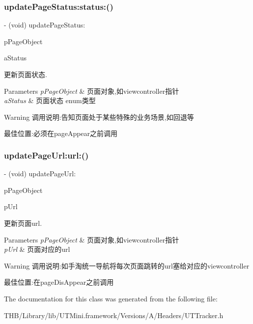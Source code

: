 \subsubsection{\texorpdfstring{update\+Page\+Status\+:status\+:()}{updatePageStatus:status:()}}
{\footnotesize\ttfamily -\/ (void) update\+Page\+Status\+: \begin{DoxyParamCaption}\item[{(id)}]{p\+Page\+Object }\item[{status:(U\+T\+Page\+Status)}]{a\+Status }\end{DoxyParamCaption}}



更新页面状态. 


\begin{DoxyParams}{Parameters}
{\em p\+Page\+Object} & 页面对象,如viewcontroller指针 \\
\hline
{\em a\+Status} & 页面状态 enum类型\\
\hline
\end{DoxyParams}
\begin{DoxyWarning}{Warning}
调用说明\+:告知页面处于某些特殊的业务场景,如回退等 \begin{DoxyVerb}                     最佳位置:必须在pageAppear之前调用\end{DoxyVerb}
 
\end{DoxyWarning}
\mbox{\label{interface_u_t_tracker_a654369a4fe09d5c85726c32979be941f}} 
\subsubsection{\texorpdfstring{update\+Page\+Url\+:url\+:()}{updatePageUrl:url:()}}
{\footnotesize\ttfamily -\/ (void) update\+Page\+Url\+: \begin{DoxyParamCaption}\item[{(id)}]{p\+Page\+Object }\item[{url:(N\+S\+U\+RL $\ast$)}]{p\+Url }\end{DoxyParamCaption}}



更新页面url. 


\begin{DoxyParams}{Parameters}
{\em p\+Page\+Object} & 页面对象,如viewcontroller指针 \\
\hline
{\em p\+Url} & 页面对应的url\\
\hline
\end{DoxyParams}
\begin{DoxyWarning}{Warning}
调用说明\+:如手淘统一导航将每次页面跳转的url塞给对应的viewcontroller \begin{DoxyVerb}                     最佳位置:在pageDisAppear之前调用\end{DoxyVerb}
 
\end{DoxyWarning}


The documentation for this class was generated from the following file\+:\begin{DoxyCompactItemize}
\item 
T\+H\+B/\+Library/lib/\+U\+T\+Mini.\+framework/\+Versions/\+A/\+Headers/U\+T\+Tracker.\+h\end{DoxyCompactItemize}
